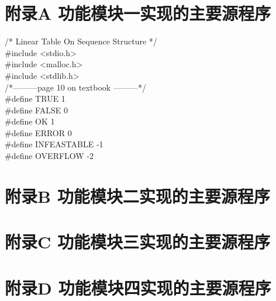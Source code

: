 \documentclass[supercite]{Experimental_Report}
\theoremstyle{definition}
\begin{document}
	
	\nocite{*} %
	
	
	
	\setcounter{secnumdepth}{0}
	\appendix
	
	\section{附录A 功能模块一实现的主要源程序}
	
	\noindent
	/* Linear Table On Sequence Structure */\\
	\#include <stdio.h>\\
	\#include <malloc.h>\\
	\#include <stdlib.h>\\
	
	\noindent
	/*---------page 10 on textbook ---------*/\\
	\#define TRUE 1\\
	\#define FALSE 0\\
	\#define OK 1\\
	\#define ERROR 0\\
	\#define INFEASTABLE -1\\
	\#define OVERFLOW -2\\
	\newpage
	\section{附录B 功能模块二实现的主要源程序}
	\newpage
	\section{附录C 功能模块三实现的主要源程序}
	\newpage
	\section{附录D 功能模块四实现的主要源程序}
	
\end{document}

